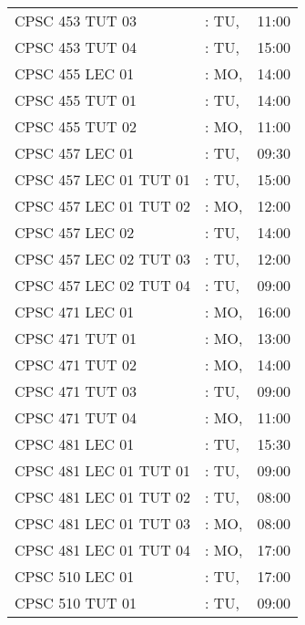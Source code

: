 \documentclass[11pt]{article}
\begin{document}
\begin{longtable}{l l r}
CPSC 453 TUT 03               &\hspace*{1.5cm}: TU,& 11:00\tabularnewline
CPSC 453 TUT 04               &\hspace*{1.5cm}: TU,& 15:00\tabularnewline
CPSC 455 LEC 01               &\hspace*{1.5cm}: MO,& 14:00\tabularnewline
CPSC 455 TUT 01               &\hspace*{1.5cm}: TU,& 14:00\tabularnewline
CPSC 455 TUT 02               &\hspace*{1.5cm}: MO,& 11:00\tabularnewline
CPSC 457 LEC 01               &\hspace*{1.5cm}: TU,& 09:30\tabularnewline
CPSC 457 LEC 01 TUT 01        &\hspace*{1.5cm}: TU,& 15:00\tabularnewline
CPSC 457 LEC 01 TUT 02        &\hspace*{1.5cm}: MO,& 12:00\tabularnewline
CPSC 457 LEC 02               &\hspace*{1.5cm}: TU,& 14:00\tabularnewline
CPSC 457 LEC 02 TUT 03        &\hspace*{1.5cm}: TU,& 12:00\tabularnewline
CPSC 457 LEC 02 TUT 04        &\hspace*{1.5cm}: TU,& 09:00\tabularnewline
CPSC 471 LEC 01               &\hspace*{1.5cm}: MO,& 16:00\tabularnewline
CPSC 471 TUT 01               &\hspace*{1.5cm}: MO,& 13:00\tabularnewline
CPSC 471 TUT 02               &\hspace*{1.5cm}: MO,& 14:00\tabularnewline
CPSC 471 TUT 03               &\hspace*{1.5cm}: TU,& 09:00\tabularnewline
CPSC 471 TUT 04               &\hspace*{1.5cm}: MO,& 11:00\tabularnewline
CPSC 481 LEC 01               &\hspace*{1.5cm}: TU,& 15:30\tabularnewline
CPSC 481 LEC 01 TUT 01        &\hspace*{1.5cm}: TU,& 09:00\tabularnewline
CPSC 481 LEC 01 TUT 02        &\hspace*{1.5cm}: TU,& 08:00\tabularnewline
CPSC 481 LEC 01 TUT 03        &\hspace*{1.5cm}: MO,& 08:00\tabularnewline
CPSC 481 LEC 01 TUT 04        &\hspace*{1.5cm}: MO,& 17:00\tabularnewline
CPSC 510 LEC 01               &\hspace*{1.5cm}: TU,& 17:00\tabularnewline
CPSC 510 TUT 01               &\hspace*{1.5cm}: TU,& 09:00\tabularnewline

\end{longtable}
\end{document}

